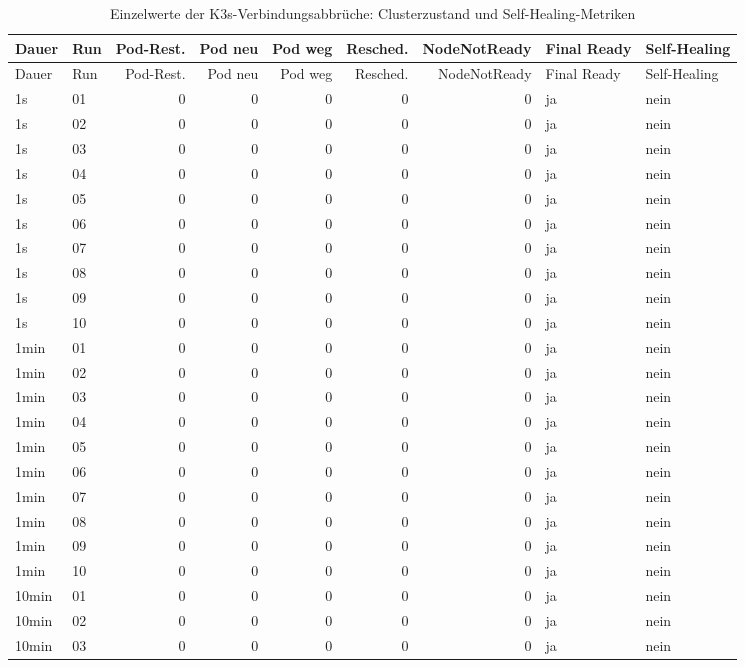 \begin{longtable}{llrrrrrll}
\caption{Einzelwerte der K3s-Verbindungsabbrüche: Clusterzustand und Self-Healing-Metriken}\label{tab:appendix-k3s-link-cut-cluster}\\
\toprule
Dauer & Run & Pod-Rest. & Pod neu & Pod weg & Resched. & NodeNotReady & Final Ready & Self-Healing \\
\midrule
\endfirsthead
\toprule
Dauer & Run & Pod-Rest. & Pod neu & Pod weg & Resched. & NodeNotReady & Final Ready & Self-Healing \\
\midrule
\endhead
1s & 01 & 0 & 0 & 0 & 0 & 0 & ja & nein \\
1s & 02 & 0 & 0 & 0 & 0 & 0 & ja & nein \\
1s & 03 & 0 & 0 & 0 & 0 & 0 & ja & nein \\
1s & 04 & 0 & 0 & 0 & 0 & 0 & ja & nein \\
1s & 05 & 0 & 0 & 0 & 0 & 0 & ja & nein \\
1s & 06 & 0 & 0 & 0 & 0 & 0 & ja & nein \\
1s & 07 & 0 & 0 & 0 & 0 & 0 & ja & nein \\
1s & 08 & 0 & 0 & 0 & 0 & 0 & ja & nein \\
1s & 09 & 0 & 0 & 0 & 0 & 0 & ja & nein \\
1s & 10 & 0 & 0 & 0 & 0 & 0 & ja & nein \\
1min & 01 & 0 & 0 & 0 & 0 & 0 & ja & nein \\
1min & 02 & 0 & 0 & 0 & 0 & 0 & ja & nein \\
1min & 03 & 0 & 0 & 0 & 0 & 0 & ja & nein \\
1min & 04 & 0 & 0 & 0 & 0 & 0 & ja & nein \\
1min & 05 & 0 & 0 & 0 & 0 & 0 & ja & nein \\
1min & 06 & 0 & 0 & 0 & 0 & 0 & ja & nein \\
1min & 07 & 0 & 0 & 0 & 0 & 0 & ja & nein \\
1min & 08 & 0 & 0 & 0 & 0 & 0 & ja & nein \\
1min & 09 & 0 & 0 & 0 & 0 & 0 & ja & nein \\
1min & 10 & 0 & 0 & 0 & 0 & 0 & ja & nein \\
10min & 01 & 0 & 0 & 0 & 0 & 0 & ja & nein \\
10min & 02 & 0 & 0 & 0 & 0 & 0 & ja & nein \\
10min & 03 & 0 & 0 & 0 & 0 & 0 & ja & nein \\

\end{longtable}
